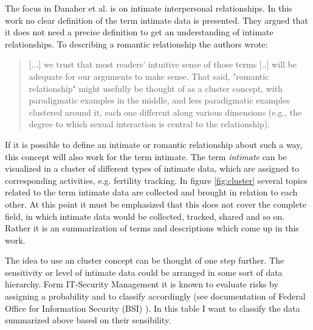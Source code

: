 The focus in Danaher et al. \cite{doi:10.1080/15265161.2017.1409823} is on intimate interpersonal relationships. In this work no clear definition of the term intimate data is presented. They argued that it does not need a precise definition to get an understanding of intimate relationships. To describing a romantic relationship the authors wrote:

\begin{quote}
	[...] we trust that most readers' intuitive sense of those terms [..] will be adequate for our arguments to make sense. That said, "romantic relationship" might usefully be thought of as a cluster concept, with paradigmatic examples in the middle, and less paradigmatic examples clustered around it, each one different along various dimensions (e.g., the degree to which sexual interaction is central to the relationship).
\end{quote}

If it is possible to define an intimate or romantic relationship about such a way, this concept will also work for the term intimate. 
The term \textit{intimate} can be visualized in a cluster of different types of intimate data, which are assigned to corresponding activities, e.g. fertility tracking.
In figure \ref{fig:cluster} several topics related to the term intimate data are collected and brought in relation to each other. At this point it must be emphasized that this does not cover the complete field, in which intimate data would be collected, tracked, shared and so on. Rather it is an summarization of terms and descriptions which come up in this work.


The idea to use an cluster concept can be thought of one step further. The sensitivity or level of intimate data could be arranged in some sort of data hierarchy. Form IT-Security Management it is known to evaluate risks by assigning a probability and to classify accordingly (see documentation of Federal Office for Information Security (BSI) \cite{bsi}). In this table I want to classify the data summarized above based on their sensibility.

